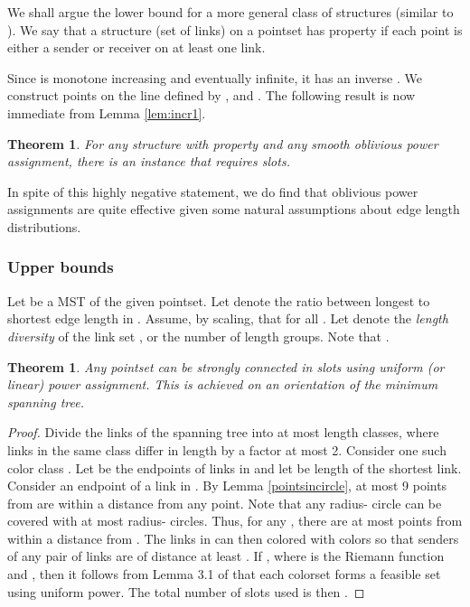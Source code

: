 \documentclass[11pt]{amsart}
\newcounter{foo}
\newtheorem{theorem}[foo]{Theorem}
\begin{document}
We shall argue the lower bound for a more general class of structures
(similar to \cite{MoWa06}).
We say that a structure (set of links) on a pointset has property
 if each point is either a sender or receiver on at least
one link.

Since  is monotone increasing and eventually infinite, it has an
inverse .
We construct  points  on the line defined by
,  and .
The following result is now immediate from Lemma \ref{lem:incr1}.

\begin{theorem}
For any structure with property 
and any smooth oblivious power assignment,
there is an instance that requires  slots.
\end{theorem}

In spite of this highly negative statement, we do find that oblivious
power assignments are quite effective given some natural assumptions
about edge length distributions. 


\subsubsection*{Upper bounds}

Let  be a MST of the given pointset.  Let  denote the ratio
between longest to shortest edge length in .  Assume, by scaling,
that  for all . Let  denote the
\emph{length diversity} of the link set , or the number of length
groups. Note that .

\begin{theorem}
Any pointset can be strongly connected in 
slots using uniform (or linear) power assignment.
This is achieved on an orientation of the minimum spanning tree.
\label{logdelta}
\end{theorem}

\begin{proof}
Divide the links of the spanning tree into at most  length
classes, where links in the same class differ in length by a factor at
most 2. Consider one such color class .
Let  be the endpoints of links in  and let  be length of
the shortest link.
Consider an endpoint  of a link in .
By Lemma \ref{pointsincircle}, at most 9 points from  are within a
distance  from any point. Note that any radius- circle can be
covered with at most  radius- circles.
Thus, for any , there are at most  points
from  within a distance  from .
The links in  can then colored with  colors so that senders of any pair of
links are of distance at least . 
If , where  is the
Riemann function and , then it follows from Lemma 3.1 of
\cite{us:esa09full} that each colorset forms a feasible set using
uniform power.
The total number of slots used is then .
\end{proof}
\end{document}
